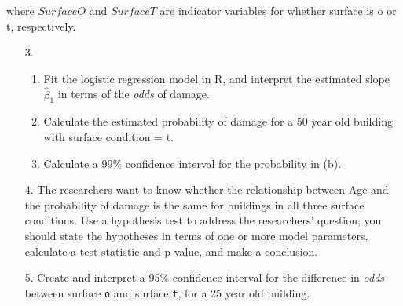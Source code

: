 \documentclass[11pt]{article}
\begin{document}
where $SurfaceO$ and $SurfaceT$ are indicator variables for whether surface is o or t, respectively.\\

\begin{enumerate}
\item[3.] 
\begin{enumerate}
\item Fit the logistic regression model in R, and interpret the estimated slope $\widehat{\beta}_1$ in terms of the \textit{odds} of damage.

\item Calculate the estimated probability of damage for a 50 year old building with surface condition = t.

\item Calculate a 99\% confidence interval for the probability in (b).
\end{enumerate}

\item[4.] The researchers want to know whether the relationship between Age and the probability of damage is the same for buildings in all three surface conditions. Use a hypothesis test to address the researchers' question; you should state the hypotheses in terms of one or more model parameters, calculate a test statistic and p-value, and make a conclusion.

\item[5.] Create and interpret a 95\% confidence interval for the difference in \textit{odds} between surface \verb;o; and surface \verb;t;, for a 25 year old building. 
\end{enumerate}
\end{document}
